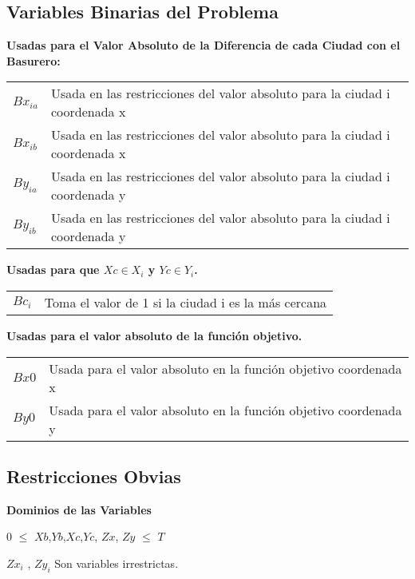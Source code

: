 \documentclass[10pt]{article}
\begin{document}
\subsection{Variables Binarias del Problema}
\textbf{Usadas para el Valor Absoluto de la Diferencia de cada Ciudad con el Basurero: }\\

\begin{tabular}{l l }
 $Bx_{ia}$ & Usada en las restricciones del valor absoluto para la ciudad i coordenada x \\
$Bx_{ib}$ & Usada en las restricciones del valor absoluto para la ciudad i  coordenada x \\
$By_{ia}$ & Usada en las restricciones del valor absoluto para la ciudad i coordenada y \\
$By_{ib}$ & Usada en las restricciones del valor absoluto para la ciudad i coordenada y \\

\end{tabular}\bigskip 

\textbf{Usadas para  que  $Xc \in X_i$ y $Yc \in Y_i$.}\\

\begin{tabular}{l l }
$Bc_i$ & Toma el valor de 1 si la ciudad i es la m\'as cercana \\
\end{tabular}\bigskip


\textbf{Usadas para  el valor absoluto de la funci\'on objetivo.}\\


\begin{tabular}{l l }
$Bx0$ &   Usada para el valor absoluto en la función objetivo coordenada x \\
$By0$ &   Usada para el valor absoluto en la función objetivo coordenada y \\
\end{tabular}\bigskip



\subsection{Restricciones Obvias}
\textbf{Dominios de las Variables}\\

\begin{center}
 $0$ $\leq $ $Xb$,$Yb$,$Xc$,$Yc$, $Zx$, $Zy$  $\leq $ $T$
 
 $Zx_i$ , $Zy_i$ Son variables irrestrictas.
\end{center}
\end{document}
